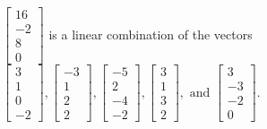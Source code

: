 \begin{exercise}
\begin{exerciseStatement}
  \end{exerciseStatement}
  \begin{exerciseAnswer}
   \(\left[\begin{array}{c}
16 \\
-2 \\
8 \\
0
\end{array}\right]\) 
  	 is  
	a linear combination of the vectors \(\left[\begin{array}{c}
3 \\
1 \\
0 \\
-2
\end{array}\right] , \left[\begin{array}{c}
-3 \\
1 \\
2 \\
2
\end{array}\right] , \left[\begin{array}{c}
-5 \\
2 \\
-4 \\
-2
\end{array}\right] , \left[\begin{array}{c}
3 \\
1 \\
3 \\
2
\end{array}\right] , \text{ and } \left[\begin{array}{c}
3 \\
-3 \\
-2 \\
0
\end{array}\right]\).

	
  


  \end{exerciseAnswer}
\end{exercise}